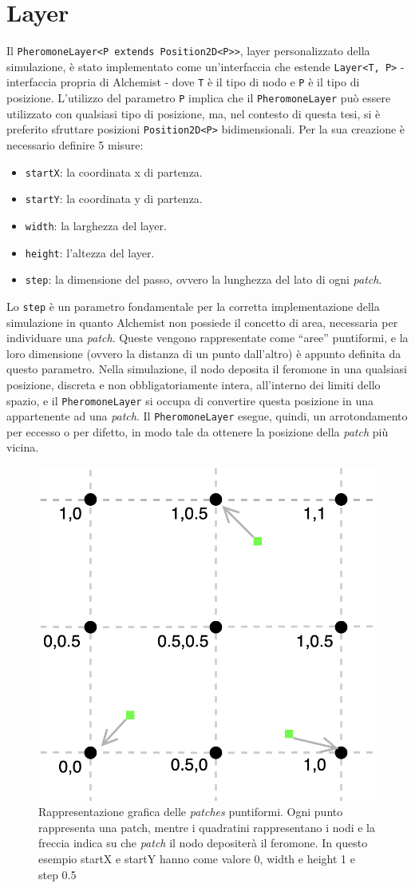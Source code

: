 \section{Layer}\label{layer}
Il \texttt{PheromoneLayer<P extends Position2D<P>>}, layer personalizzato della simulazione, è stato implementato 
come un'interfaccia che estende \texttt{Layer<T, P>} - interfaccia propria di Alchemist - 
dove \texttt{T} è il tipo di nodo e \texttt{P} è il tipo di posizione. 
L'utilizzo del parametro \texttt{P} implica che il \texttt{PheromoneLayer} può essere utilizzato con qualsiasi tipo di posizione, ma, nel contesto di questa tesi,
si è preferito sfruttare posizioni \texttt{Position2D<P>} bidimensionali.
Per la sua creazione è necessario definire 5 misure:
\begin{itemize}
    \item \texttt{startX}: la coordinata x di partenza.
    \item \texttt{startY}: la coordinata y di partenza.
    \item \texttt{width}: la larghezza del layer.
    \item \texttt{height}: l'altezza del layer.
    \item \texttt{step}: la dimensione del passo, ovvero la lunghezza del lato di ogni \textit{patch}.
\end{itemize}
Lo \texttt{step} è un parametro fondamentale per la corretta implementazione della simulazione
in quanto Alchemist non possiede il concetto di area, necessaria per individuare una \textit{patch}.
Queste vengono rappresentate come ``aree'' puntiformi, e la loro dimensione (ovvero la distanza di un punto dall'altro) è appunto definita da questo parametro.
Nella simulazione, il nodo deposita il feromone in una qualsiasi posizione, discreta e non obbligatoriamente intera, all'interno dei limiti dello spazio, e il \texttt{PheromoneLayer} 
si occupa di convertire questa posizione in una appartenente ad una \textit{patch}. 
Il \texttt{PheromoneLayer} esegue, quindi, un arrotondamento per eccesso o per difetto, in modo tale da ottenere la posizione della \textit{patch} più vicina.
\begin{figure}[ht]
    \centering
    \includegraphics[width=.3\linewidth]{figures/patch-nodi.png}
    \caption{Rappresentazione grafica delle \textit{patches} puntiformi. Ogni punto rappresenta una patch,
    mentre i quadratini rappresentano i nodi e la freccia indica su che \textit{patch} il nodo depositerà il feromone. In questo esempio
    startX e startY hanno come valore 0, width e height 1 e step 0.5}\label{fig:patch-nodi}
\end{figure}

